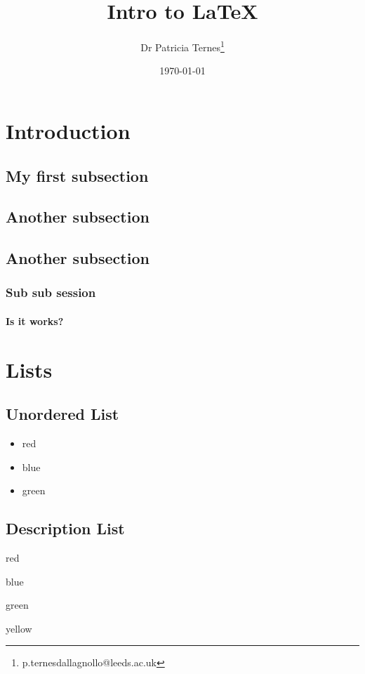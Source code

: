 \documentclass{article}
\title{Intro to \LaTeX}
\author{Dr Patricia Ternes\thanks{p.ternesdallagnollo@leeds.ac.uk}}
\date{\today}
\begin{document}
\maketitle
\begin{abstract}
    \blindtext[1]
\end{abstract}

\tableofcontents
\listoftables
\listoffigures

\section{Introduction}
\blindtext[1]
\subsection{My first subsection}
\blindtext[1]
\subsection{Another subsection}
\blindtext[1]
\subsection{Another subsection}
\blindtext[1]
\subsubsection{Sub sub session}
\blindtext[1]
\paragraph{Is it works?}
\blindtext[1]

\section{Lists}
\subsection{Unordered List}
\begin{itemize}
    \item red
    \item blue
    \item green
\end{itemize}

\blindtext[1]

\subsection{Description List}
\begin{description}
    \item[apple] red
    \item[sky] blue
    \item[leaf] green
    \item yellow
\end{description}
\end{document}
